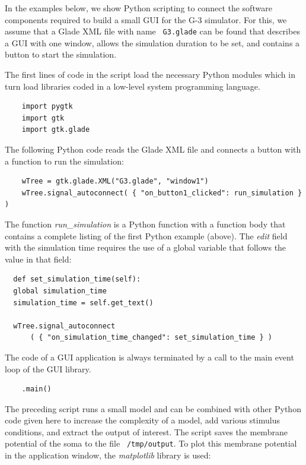\documentclass[10pt]{article}
\begin{document}


In the examples below, we show Python scripting to connect the
software components required to build a small GUI for the G-3
simulator.  For this, we assume that a Glade XML file with name {\tt
  G3.glade} can be found that describes a GUI with one window, allows the simulation duration to be set, and contains a
button to start the simulation.

The first lines of code in the script load the necessary Python
modules which in turn load libraries coded in a low-level system
programming language.

\begin{verbatim}
    import pygtk
    import gtk
    import gtk.glade
\end{verbatim}

The following Python code reads the Glade XML file and connects a
button with a function to run the simulation:

\begin{verbatim}
    wTree = gtk.glade.XML("G3.glade", "window1")
    wTree.signal_autoconnect( { "on_button1_clicked": run_simulation } )
\end{verbatim}

The function {\it run\_simulation} is a Python function with a
function body that contains a complete listing of the first Python
example (above). The {\it edit} field with the simulation time
requires the use of a global variable that follows the value in that
field:

\begin{verbatim}
  def set_simulation_time(self):
  global simulation_time
  simulation_time = self.get_text()
    
  wTree.signal_autoconnect
      ( { "on_simulation_time_changed": set_simulation_time } )
\end{verbatim}

The code of a GUI application is always terminated by a call to the
main event loop of the GUI library.

  \begin{verbatim}
    .main()
\end{verbatim}

The preceding script runs a small model and can be combined with other Python
code given here to increase the complexity of a model, add various
stimulus conditions, and extract the output of interest.  The script
saves the membrane potential of the soma to the file {\tt
  /tmp/output}.  To plot this membrane potential in the application
window, the {\it matplotlib} library is used:
\end{document}
